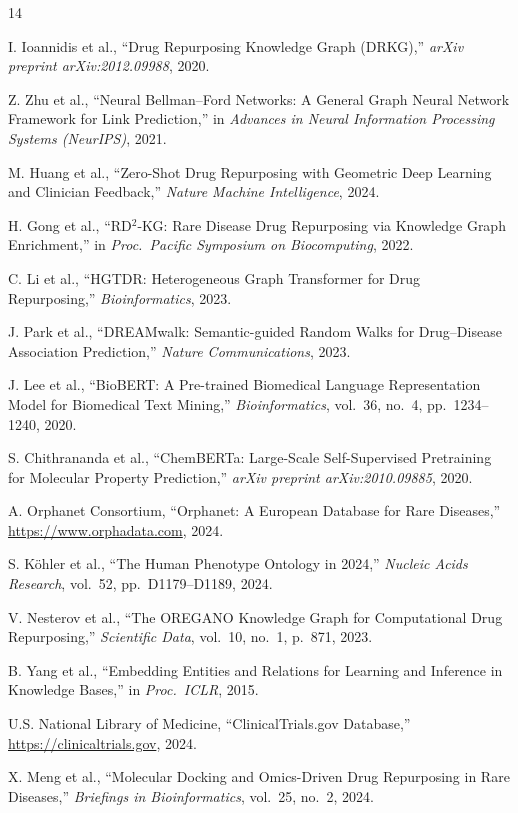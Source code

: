 \documentclass[conference]{IEEEtran}
\begin{document}
\begin{thebibliography}{14}

I. Ioannidis et al., ``Drug Repurposing Knowledge Graph (DRKG),'' \textit{arXiv preprint arXiv:2012.09988}, 2020.

Z. Zhu et al., ``Neural Bellman--Ford Networks: A General Graph Neural Network Framework for Link Prediction,'' in \textit{Advances in Neural Information Processing Systems (NeurIPS)}, 2021.

M. Huang et al., ``Zero-Shot Drug Repurposing with Geometric Deep Learning and Clinician Feedback,'' \textit{Nature Machine Intelligence}, 2024.

H. Gong et al., ``RD$^2$-KG: Rare Disease Drug Repurposing via Knowledge Graph Enrichment,'' in \textit{Proc.\ Pacific Symposium on Biocomputing}, 2022.

C. Li et al., ``HGTDR: Heterogeneous Graph Transformer for Drug Repurposing,'' \textit{Bioinformatics}, 2023.

J. Park et al., ``DREAMwalk: Semantic-guided Random Walks for Drug--Disease Association Prediction,'' \textit{Nature Communications}, 2023.

J. Lee et al., ``BioBERT: A Pre-trained Biomedical Language Representation Model for Biomedical Text Mining,'' \textit{Bioinformatics}, vol.~36, no.~4, pp.~1234--1240, 2020.

S. Chithrananda et al., ``ChemBERTa: Large-Scale Self-Supervised Pretraining for Molecular Property Prediction,'' \textit{arXiv preprint arXiv:2010.09885}, 2020.

A. Orphanet Consortium, ``Orphanet: A European Database for Rare Diseases,'' \url{https://www.orphadata.com}, 2024.

S. K\"{o}hler et al., ``The Human Phenotype Ontology in 2024,'' \textit{Nucleic Acids Research}, vol.~52, pp.~D1179--D1189, 2024.

V. Nesterov et al., ``The OREGANO Knowledge Graph for Computational Drug Repurposing,'' \textit{Scientific Data}, vol.~10, no.~1, p.~871, 2023.

B. Yang et al., ``Embedding Entities and Relations for Learning and Inference in Knowledge Bases,'' in \textit{Proc.\ ICLR}, 2015.

U.S. National Library of Medicine, ``ClinicalTrials.gov Database,'' \url{https://clinicaltrials.gov}, 2024.

X. Meng et al., ``Molecular Docking and Omics-Driven Drug Repurposing in Rare Diseases,'' \textit{Briefings in Bioinformatics}, vol.~25, no.~2, 2024.

\end{thebibliography}
\end{document}
